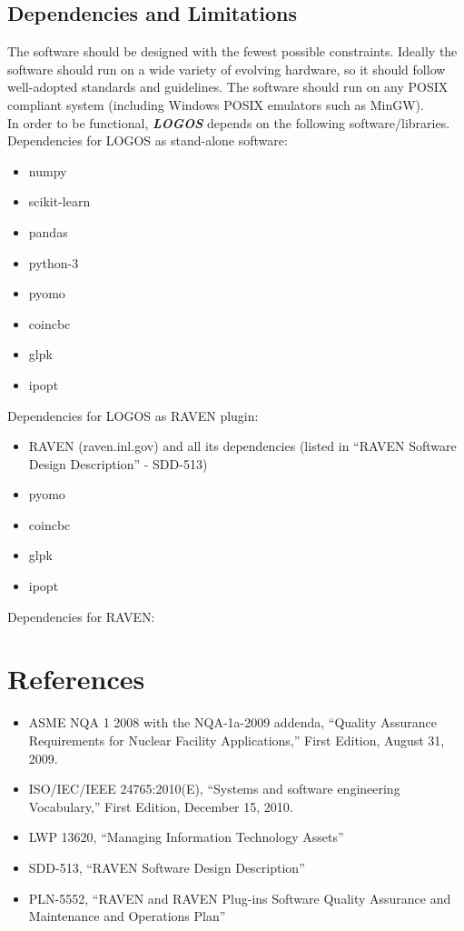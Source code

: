 \subsection{Dependencies and Limitations}
The software should be designed with the fewest possible constraints.
Ideally the software should run on a wide variety of evolving hardware,
so it should follow well-adopted standards and guidelines. The software
should run on any POSIX compliant system (including Windows POSIX
emulators such as MinGW).
\\In order to be functional, \textbf{\textit{LOGOS}} depends on the
following software/libraries.
Dependencies for LOGOS as stand-alone software:
\begin{itemize}
  \item numpy
  \item scikit-learn
  \item pandas
  \item python-3
  \item pyomo
  \item coincbc
  \item glpk
  \item ipopt
\end{itemize}

Dependencies for LOGOS as RAVEN plugin:
\begin{itemize}
  \item RAVEN (raven.inl.gov) and all its dependencies (listed in ``RAVEN Software Design
    Description'' - SDD-513)
  \item pyomo
  \item coincbc
  \item glpk
  \item ipopt
\end{itemize}

Dependencies for RAVEN:


\section{References}

\begin{itemize}
  \item ASME NQA 1 2008 with the NQA-1a-2009 addenda, ``Quality Assurance Requirements for Nuclear Facility Applications,'' First Edition, August 31, 2009.
  \item ISO/IEC/IEEE 24765:2010(E), ``Systems and software engineering Vocabulary,'' First Edition, December 15, 2010.
  \item LWP 13620, ``Managing Information Technology Assets''
  \item SDD-513, ``RAVEN Software Design Description''
  \item PLN-5552, ``RAVEN and RAVEN Plug-ins Software Quality Assurance and Maintenance and Operations Plan''
\end{itemize}


